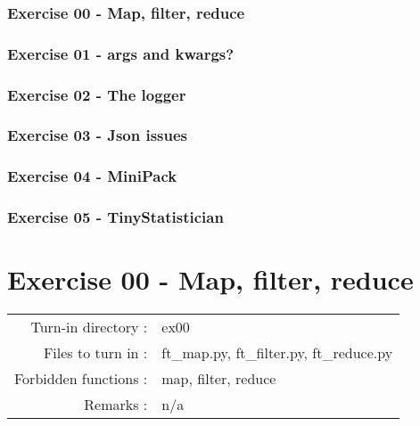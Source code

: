 \documentclass[]{article}
\begin{document}
\hypertarget{exercise-00---map-filter-reduce}{%
\subsubsection{Exercise 00 - Map, filter,
reduce}\label{exercise-00---map-filter-reduce}}

\hypertarget{exercise-01---args-and-kwargs}{%
\subsubsection{Exercise 01 - args and
kwargs?}\label{exercise-01---args-and-kwargs}}

\hypertarget{exercise-02---the-logger}{%
\subsubsection{Exercise 02 - The
logger}\label{exercise-02---the-logger}}

\hypertarget{exercise-03---json-issues}{%
\subsubsection{Exercise 03 - Json
issues}\label{exercise-03---json-issues}}

\hypertarget{exercise-04---minipack}{%
\subsubsection{Exercise 04 - MiniPack}\label{exercise-04---minipack}}

\hypertarget{exercise-05---tinystatistician}{%
\subsubsection{Exercise 05 -
TinyStatistician}\label{exercise-05---tinystatistician}}

\clearpage

\hypertarget{exercise-00---map-filter-reduce-1}{%
\section{Exercise 00 - Map, filter,
reduce}\label{exercise-00---map-filter-reduce-1}}

\begin{longtable}[]{@{}rl@{}}
\toprule
\endhead
Turn-in directory : & ex00\tabularnewline
Files to turn in : & ft\_map.py, ft\_filter.py,
ft\_reduce.py\tabularnewline
Forbidden functions : & map, filter, reduce\tabularnewline
Remarks : & n/a\tabularnewline
\bottomrule
\end{longtable}
\end{document}
